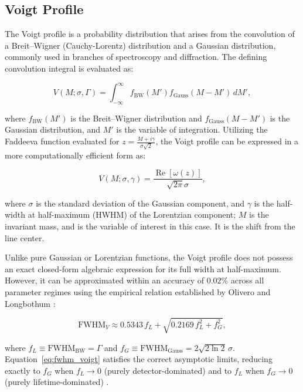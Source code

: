 \documentclass[11pt, a4paper]{article}
\numberwithin{equation}{section}
\begin{document}
\subsection{Voigt Profile}

The Voigt profile is a probability distribution that arises from the convolution of a Breit--Wigner (Cauchy-Lorentz) distribution and a Gaussian distribution, commonly used in branches of spectroscopy and diffraction. The defining convolution integral is evaluated as:

\begin{equation} V(M; \sigma, \Gamma) = \int_{-\infty}^{\infty} f_{\text{BW}}(M') f_{\text{Gauss}}(M - M') \, dM', \end{equation}

where $f_{\text{BW}}(M')$ is the Breit--Wigner distribution and $f_{\text{Gauss}}(M - M')$ is the Gaussian distribution, and $M'$ is the variable of integration. Utilizing the Faddeeva function \cite{lehtinen2010errorfunctions} evaluated for $z = \frac{M + i\gamma}{\sigma \sqrt{2}}$, the Voigt profile can be expressed in a more computationally efficient form as:

\begin{equation} V(M; \sigma, \gamma) = \frac{\operatorname{Re}[\omega(z)]}{\sqrt{2\pi} \sigma}, \end{equation}

where $\sigma$ is the standard deviation of the Gaussian component, and $\gamma$ is the half-width at half-maximum (HWHM) of the Lorentzian component; $M$ is the invariant mass, and is the variable of interest in this case. It is the shift from the line center.

Unlike pure Gaussian or Lorentzian functions, the Voigt profile does not possess an exact closed-form algebraic expression for its full width at half-maximum. However, it can be approximated within an accuracy of $0.02\%$ across all parameter regimes using the empirical relation established by Olivero and Longbothum \cite{olivero1977empirical}:

\begin{equation}
\text{FWHM}_V \approx 0.5343\, f_L + \sqrt{0.2169\, f_L^2 + f_G^2},
\label{eq:fwhm_voigt}
\end{equation}

where $f_L \equiv \text{FWHM}_{\text{BW}} = \Gamma$ and $f_G \equiv \text{FWHM}_{\text{Gauss}} = 2\sqrt{2\ln 2}\,\sigma$. Equation~\eqref{eq:fwhm_voigt} satisfies the correct asymptotic limits, reducing exactly to $f_G$ when $f_L \to 0$ (purely detector-dominated) and to $f_L$ when $f_G \to 0$ (purely lifetime-dominated) \cite{olivero1977empirical}.
\end{document}
